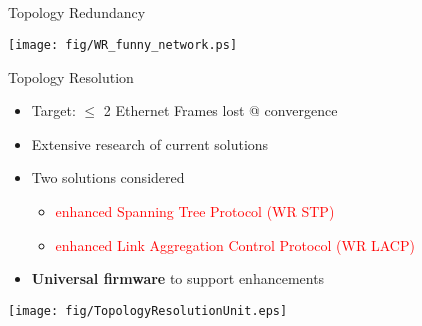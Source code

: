 \documentclass[compress,red]{beamer}
\begin{document}
\subsection{}
\begin{frame}{Topology Redundancy}

      \begin{center}
	\texttt{[image: fig/WR\_funny\_network.ps]}
      \end{center}

\end{frame}
\begin{frame}{Topology Resolution}

  \begin{itemize}
    \item Target: $\leq$ 2 Ethernet Frames lost @ convergence
    \item Extensive research of current solutions
    \item Two solutions considered
    \begin{itemize}
      \item \textcolor{red}{enhanced Spanning Tree Protocol (WR STP)}
      \item \textcolor{red}{enhanced Link Aggregation Control Protocol (WR LACP)}
    \end{itemize}
    \item {\bf Universal firmware} to support enhancements
  \end{itemize}

      \begin{center}
	\texttt{[image: fig/TopologyResolutionUnit.eps]}
      \end{center}

\end{frame}
\end{document}
